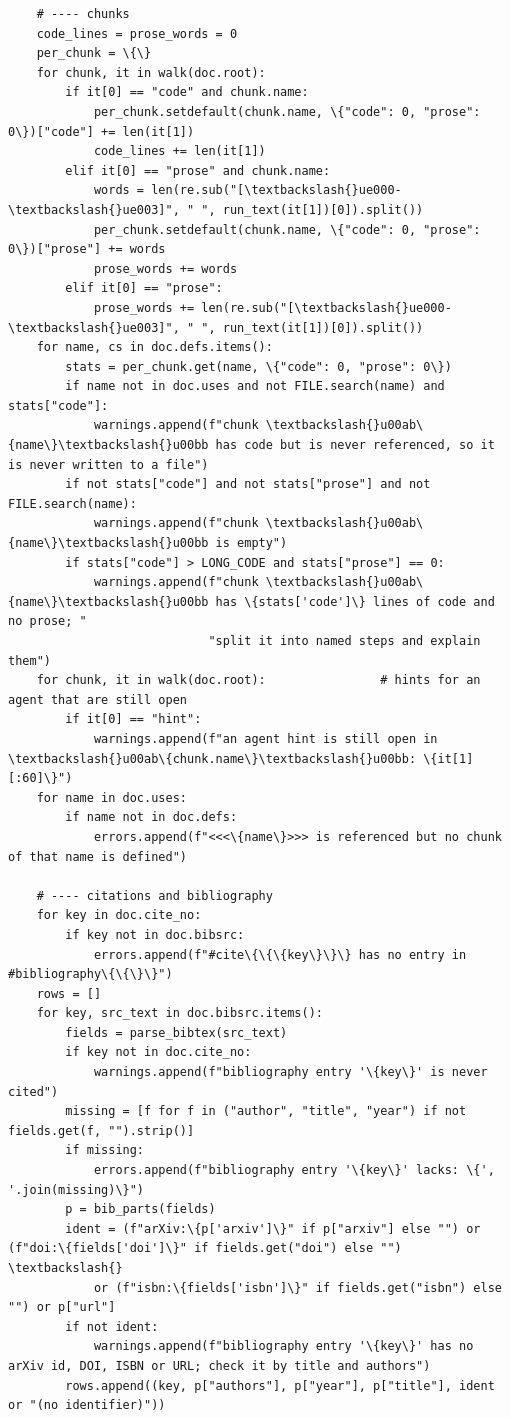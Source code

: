 \documentclass[10pt,a4paper]{article}
\newcounter{chunk}
\begin{document}
\begin{Verbatim}
    # ---- chunks
    code_lines = prose_words = 0
    per_chunk = \{\}
    for chunk, it in walk(doc.root):
        if it[0] == "code" and chunk.name:
            per_chunk.setdefault(chunk.name, \{"code": 0, "prose": 0\})["code"] += len(it[1])
            code_lines += len(it[1])
        elif it[0] == "prose" and chunk.name:
            words = len(re.sub("[\textbackslash{}ue000-\textbackslash{}ue003]", " ", run_text(it[1])[0]).split())
            per_chunk.setdefault(chunk.name, \{"code": 0, "prose": 0\})["prose"] += words
            prose_words += words
        elif it[0] == "prose":
            prose_words += len(re.sub("[\textbackslash{}ue000-\textbackslash{}ue003]", " ", run_text(it[1])[0]).split())
    for name, cs in doc.defs.items():
        stats = per_chunk.get(name, \{"code": 0, "prose": 0\})
        if name not in doc.uses and not FILE.search(name) and stats["code"]:
            warnings.append(f"chunk \textbackslash{}u00ab\{name\}\textbackslash{}u00bb has code but is never referenced, so it is never written to a file")
        if not stats["code"] and not stats["prose"] and not FILE.search(name):
            warnings.append(f"chunk \textbackslash{}u00ab\{name\}\textbackslash{}u00bb is empty")
        if stats["code"] > LONG_CODE and stats["prose"] == 0:
            warnings.append(f"chunk \textbackslash{}u00ab\{name\}\textbackslash{}u00bb has \{stats['code']\} lines of code and no prose; "
                            "split it into named steps and explain them")
    for chunk, it in walk(doc.root):                # hints for an agent that are still open
        if it[0] == "hint":
            warnings.append(f"an agent hint is still open in \textbackslash{}u00ab\{chunk.name\}\textbackslash{}u00bb: \{it[1][:60]\}")
    for name in doc.uses:
        if name not in doc.defs:
            errors.append(f"<<<\{name\}>>> is referenced but no chunk of that name is defined")

    # ---- citations and bibliography
    for key in doc.cite_no:
        if key not in doc.bibsrc:
            errors.append(f"#cite\{\{\{key\}\}\} has no entry in #bibliography\{\{\}\}")
    rows = []
    for key, src_text in doc.bibsrc.items():
        fields = parse_bibtex(src_text)
        if key not in doc.cite_no:
            warnings.append(f"bibliography entry '\{key\}' is never cited")
        missing = [f for f in ("author", "title", "year") if not fields.get(f, "").strip()]
        if missing:
            errors.append(f"bibliography entry '\{key\}' lacks: \{', '.join(missing)\}")
        p = bib_parts(fields)
        ident = (f"arXiv:\{p['arxiv']\}" if p["arxiv"] else "") or (f"doi:\{fields['doi']\}" if fields.get("doi") else "") \textbackslash{}
            or (f"isbn:\{fields['isbn']\}" if fields.get("isbn") else "") or p["url"]
        if not ident:
            warnings.append(f"bibliography entry '\{key\}' has no arXiv id, DOI, ISBN or URL; check it by title and authors")
        rows.append((key, p["authors"], p["year"], p["title"], ident or "(no identifier)"))


\end{Verbatim}
\end{document}
